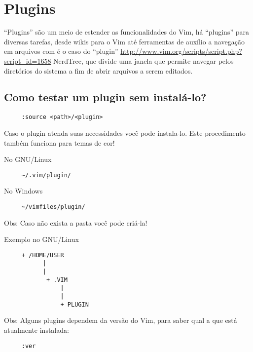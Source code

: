 
\chapter{Plugins}\label{Plugins}

``Plugins'' são um meio de estender as funcionalidades do Vim, há
``plugins'' para diversas tarefas, desde wikis para o Vim até
ferramentas de auxílio a navegação em arquivos com é o caso do
``plugin'' \url{http://www.vim.org/scripts/script.php?script\_id=1658}
NerdTree, que divide uma janela que permite navegar pelos diretórios
do sistema a fim de abrir arquivos a serem editados.

\section{Como testar um plugin sem instalá-lo?}
\label{Como testar um plugin sem instala-lo?}

\begin{verbatim}
     :source <path>/<plugin>
\end{verbatim}

Caso o plugin atenda suas necessidades você pode instala-lo. Este
procedimento também funciona para temas de cor!



No GNU/Linux
\begin{verbatim}
     ~/.vim/plugin/
\end{verbatim}

No Windows

\begin{verbatim}
     ~/vimfiles/plugin/
\end{verbatim}

Obs: Caso não exista a pasta você pode criá-la!

Exemplo no GNU/Linux

\begin{verbatim}
     + /HOME/USER
           |
           |
            + .VIM
                |
                |
                + PLUGIN
\end{verbatim}

Obs: Alguns plugins dependem da versão do Vim, para saber qual
a que está atualmente instalada:

\begin{verbatim}
     :ver
\end{verbatim}

